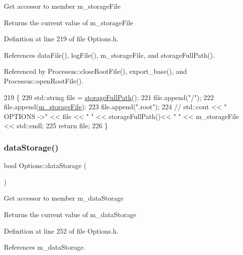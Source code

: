Get accessor to member m\+\_\+storage\+File \begin{DoxyReturn}{Returns}
the current value of m\+\_\+storage\+File 
\end{DoxyReturn}


Definition at line 219 of file Options.\+h.



References data\+File(), log\+File(), m\+\_\+storage\+File, and storage\+Full\+Path().



Referenced by Processus\+::close\+Root\+File(), export\+\_\+base(), and Processus\+::open\+Root\+File().


\begin{DoxyCode}
219                                      \{
220                 std::string file = \hyperlink{classOptions_aa5fe6b85088f3012226869480790a383}{storageFullPath}();
221                 file.append(\textcolor{stringliteral}{"/"});
222                 file.append(\hyperlink{classOptions_a4d952db4e93d3aae6db86d89faa3677a}{m\_storageFile});
223                 file.append(\textcolor{stringliteral}{".root"});
224                 \textcolor{comment}{//    std::cout << " OPTIONS ->" << file << " " << storageFullPath()<< " " << m\_storageFile
        << std::endl;}
225                 \textcolor{keywordflow}{return} file;
226         \}
\end{DoxyCode}
\mbox{\label{classOptions_aed7799d10139fa542055b982cb820192}} 
\subsubsection{\texorpdfstring{data\+Storage()}{dataStorage()}}
{\footnotesize\ttfamily bool Options\+::data\+Storage (\begin{DoxyParamCaption}{ }\end{DoxyParamCaption})\hspace{0.3cm}{\ttfamily [inline]}}

Get accessor to member m\+\_\+data\+Storage \begin{DoxyReturn}{Returns}
the current value of m\+\_\+data\+Storage 
\end{DoxyReturn}


Definition at line 252 of file Options.\+h.



References m\+\_\+data\+Storage.



